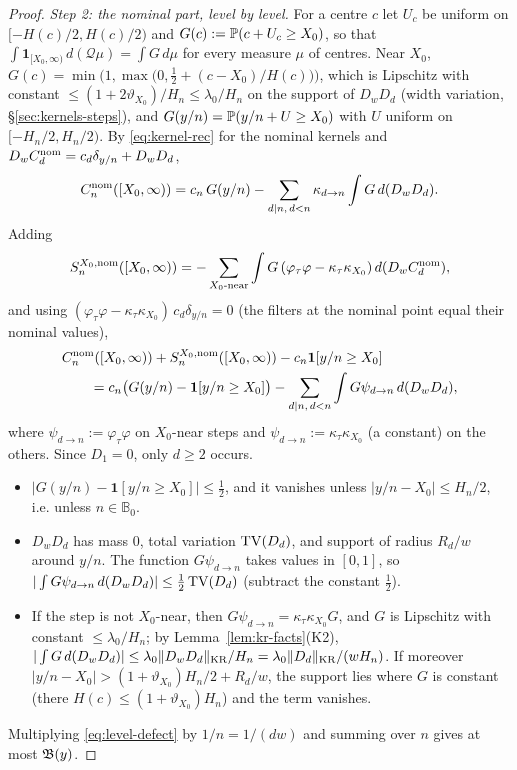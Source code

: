 \begin{proof}
\emph{Step 2: the nominal part, level by level.} For a centre $c$ let $U_c$ be uniform on $[-H(c)/2,H(c)/2)$ and
$G(c):=\mathbb{P}(c+U_c\ge X_0)$, so that $\int\mathbf 1_{[X_0,\infty)}\,d(\mathcal Q\mu)=\int G\,d\mu$ for every measure $\mu$ of
centres. Near $X_0$, $G(c)=\min\bigl(1,\max\bigl(0,\frac12+(c-X_0)/H(c)\bigr)\bigr)$, which is Lipschitz with constant
$\le(1+2\vartheta_{X_0})/H_n\le\lambda_0/H_n$ on the support of $D_wD_d$ (width variation, \S\ref{sec:kernels-steps}), and
$G(y/n)=\mathbb{P}(y/n+U\ge X_0)$ with $U$ uniform on $[-H_n/2,H_n/2)$. By \eqref{eq:kernel-rec} for
the nominal kernels and $D_wC_d^{\mathrm{nom}}=c_d\delta_{y/n}+D_wD_d$,
\[
  C_n^{\mathrm{nom}}([X_0,\infty))=c_n\,G(y/n)-\sum_{d\mid n,\,d<n}\kappa_{d\to n}\int G\,d(D_wD_d).
\]
Adding
\[
  S_n^{X_0,\mathrm{nom}}([X_0,\infty))=-\sum_{X_0\text{-near}}\int G\,(\varphi_\tau\varphi-\kappa_\tau\kappa_{X_0})\,d(D_wC_d^{\mathrm{nom}}),
\]
and using $(\varphi_\tau\varphi-\kappa_\tau\kappa_{X_0})\,c_d\delta_{y/n}=0$ (the filters at the nominal point equal their nominal values),
\begin{equation}\label{eq:level-defect}
\begin{split}
  &C_n^{\mathrm{nom}}([X_0,\infty))+S_n^{X_0,\mathrm{nom}}([X_0,\infty))-c_n\mathbf 1[y/n\ge X_0]\\
  &\qquad=c_n\bigl(G(y/n)-\mathbf 1[y/n\ge X_0]\bigr)-\sum_{d\mid n,\,d<n}\int G\psi_{d\to n}\,d(D_wD_d),
\end{split}
\end{equation}
where $\psi_{d\to n}:=\varphi_\tau\varphi$ on $X_0$-near steps and $\psi_{d\to n}:=\kappa_\tau\kappa_{X_0}$ (a constant) on the
others. Since $D_1=0$, only $d\ge2$ occurs.
\begin{itemize}
\item $|G(y/n)-\mathbf 1[y/n\ge X_0]|\le\frac12$, and it vanishes unless $|y/n-X_0|\le H_n/2$, i.e. unless $n\in\mathbb B_0$.
\item $D_wD_d$ has mass $0$, total variation $\operatorname{TV}(D_d)$, and support of radius $R_d/w$ around $y/n$. The function
  $G\psi_{d\to n}$ takes values in $[0,1]$, so $|\int G\psi_{d\to n}\,d(D_wD_d)|\le\frac12\operatorname{TV}(D_d)$ (subtract the constant $\frac12$).
\item If the step is not $X_0$-near, then $G\psi_{d\to n}=\kappa_\tau\kappa_{X_0}G$, and $G$ is Lipschitz with constant
  $\le\lambda_0/H_n$; by Lemma~\ref{lem:kr-facts}(K2), $|\int G\,d(D_wD_d)|\le\lambda_0\lVert D_wD_d\rVert_{\mathrm{KR}}/H_n=\lambda_0\lVert D_d\rVert_{\mathrm{KR}}/(wH_n)$. If moreover
  $|y/n-X_0|>(1+\vartheta_{X_0})H_n/2+R_d/w$, the support lies where $G$ is constant (there $H(c)\le(1+\vartheta_{X_0})H_n$)
  and the term vanishes.
\end{itemize}
Multiplying \eqref{eq:level-defect} by $1/n=1/(dw)$ and summing over $n$ gives at most $\mathfrak{B}(y)$.


\end{proof}
